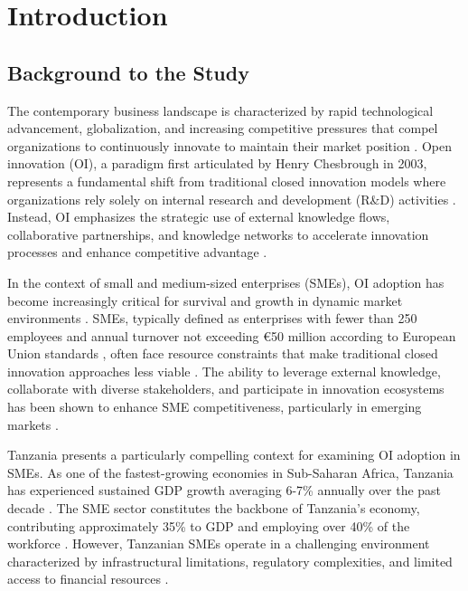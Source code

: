 \chapter{Introduction}

\section{Background to the Study}

The contemporary business landscape is characterized by rapid technological advancement, globalization, and increasing competitive pressures that compel organizations to continuously innovate to maintain their market position \citep{chesbrough2003open}. Open innovation (OI), a paradigm first articulated by Henry Chesbrough in 2003, represents a fundamental shift from traditional closed innovation models where organizations rely solely on internal research and development (R\&D) activities \citep{chesbrough2003open}. Instead, OI emphasizes the strategic use of external knowledge flows, collaborative partnerships, and knowledge networks to accelerate innovation processes and enhance competitive advantage \citep{chesbrough2006open, west2006open}.

In the context of small and medium-sized enterprises (SMEs), OI adoption has become increasingly critical for survival and growth in dynamic market environments \citep{van2010open}. SMEs, typically defined as enterprises with fewer than 250 employees and annual turnover not exceeding €50 million according to European Union standards \citep{european2015user}, often face resource constraints that make traditional closed innovation approaches less viable \citep{lee2010open}. The ability to leverage external knowledge, collaborate with diverse stakeholders, and participate in innovation ecosystems has been shown to enhance SME competitiveness, particularly in emerging markets \citep{gassmann2010towards}.

Tanzania presents a particularly compelling context for examining OI adoption in SMEs. As one of the fastest-growing economies in Sub-Saharan Africa, Tanzania has experienced sustained GDP growth averaging 6-7\% annually over the past decade \citep{worldbank2023tanzania}. The SME sector constitutes the backbone of Tanzania's economy, contributing approximately 35\% to GDP and employing over 40\% of the workforce \citep{tanzania2022sme}. However, Tanzanian SMEs operate in a challenging environment characterized by infrastructural limitations, regulatory complexities, and limited access to financial resources \citep{mn2019challenges}.

